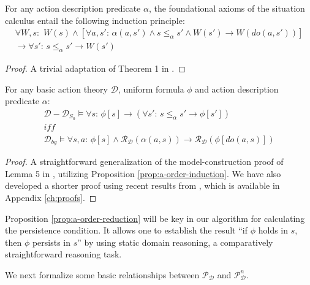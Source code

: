 \begin{prop}
For any action description predicate $\alpha$, the foundational axioms
of the situation calculus entail the following induction principle:\label{prop:a-order-induction}\begin{multline*}
\forall W,s:\,\, W(s)\wedge\left[\forall a,s':\,\alpha(a,s')\wedge s\leq_{\alpha}s'\wedge W(s')\rightarrow W(do(a,s'))\right]\\
\rightarrow\forall s':\, s\leq_{\alpha}s'\rightarrow W(s')\end{multline*}

\end{prop}
\begin{proof}
A trivial adaptation of Theorem 1 in \citep{Reiter93proving}. 
\end{proof}
\begin{prop}
For any basic action theory $\mathcal{D}$, uniform formula $\phi$
and action description predicate $\alpha$:\label{prop:a-order-reduction}\begin{gather*}
\mathcal{D}-\mathcal{D}_{S_{0}}\models\forall s:\,\phi[s]\rightarrow\left(\forall s':\, s\leq_{\alpha}s'\rightarrow\phi[s']\right)\\
\mathit{iff}\\
\mathcal{D}_{bg}\models\forall s,a:\,\phi[s]\wedge\mathcal{R}_{\mathcal{D}}(\alpha(a,s))\rightarrow\mathcal{R}_{\mathcal{D}}(\phi[do(a,s)])\end{gather*}

\end{prop}
\begin{proof}
A straightforward generalization of the model-construction proof of
Lemma 5 in \citep{Lin94-StateConstraints}, utilizing Proposition
\ref{prop:a-order-induction}. We have also developed a shorter proof
using recent results from \citep{savelli06sc_quantum_levels}, which
is available in Appendix \ref{ch:proofs}. 
\end{proof}
Proposition \ref{prop:a-order-reduction} will be key in our algorithm
for calculating the persistence condition. It allows one to establish
the result {}``if $\phi$ holds in $s$, then $\phi$ persists in
$s$'' by using static domain reasoning, a comparatively straightforward
reasoning task.

We next formalize some basic relationships between $\mathcal{P}_{\mathcal{D}}$
and $\mathcal{P}_{\mathcal{D}}^{n}$.

